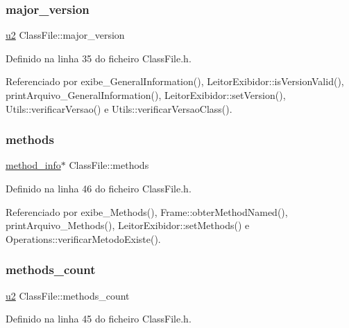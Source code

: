 \subsubsection{\texorpdfstring{major\+\_\+version}{major\_version}}
{\footnotesize\ttfamily \hyperlink{BasicTypes_8h_a732cde1300aafb73b0ea6c2558a7a54f}{u2} Class\+File\+::major\+\_\+version}



Definido na linha 35 do ficheiro Class\+File.\+h.



Referenciado por exibe\+\_\+\+General\+Information(), Leitor\+Exibidor\+::is\+Version\+Valid(), print\+Arquivo\+\_\+\+General\+Information(), Leitor\+Exibidor\+::set\+Version(), Utils\+::verificar\+Versao() e Utils\+::verificar\+Versao\+Class().

\mbox{\label{classClassFile_ad061f06cd709d10dbfbf82f443e43632}} 
\subsubsection{\texorpdfstring{methods}{methods}}
{\footnotesize\ttfamily \hyperlink{structmethod__info}{method\+\_\+info}$\ast$ Class\+File\+::methods}



Definido na linha 46 do ficheiro Class\+File.\+h.



Referenciado por exibe\+\_\+\+Methods(), Frame\+::obter\+Method\+Named(), print\+Arquivo\+\_\+\+Methods(), Leitor\+Exibidor\+::set\+Methods() e Operations\+::verificar\+Metodo\+Existe().

\mbox{\label{classClassFile_aacfb45d4af64216324b1ae5269c870d5}} 
\subsubsection{\texorpdfstring{methods\+\_\+count}{methods\_count}}
{\footnotesize\ttfamily \hyperlink{BasicTypes_8h_a732cde1300aafb73b0ea6c2558a7a54f}{u2} Class\+File\+::methods\+\_\+count}



Definido na linha 45 do ficheiro Class\+File.\+h.



